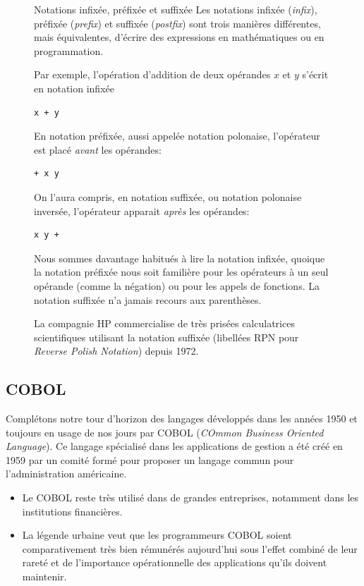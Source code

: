 \begin{figure}[t]
  \setlength{\FrameRule}{1pt}
  \begin{emphbox}{\mdseries Notations infixée, préfixée et suffixée}
    Les notations infixée (\emph{infix}), préfixée (\emph{prefix}) et
    suffixée (\emph{postfix}) sont trois manières différentes, mais
    équivalentes, d'écrire des expressions en mathématiques ou en
    programmation.

    Par exemple, l'opération d'addition de deux opérandes $x$ et $y$
    s'écrit en notation infixée
\begin{lstlisting}[backgroundcolor=\color{codebg}]
x + y
\end{lstlisting}
    En notation préfixée, aussi appelée notation polonaise,
    l'opérateur est placé \emph{avant} les opérandes:
\begin{lstlisting}[backgroundcolor=\color{codebg}]
+ x y
\end{lstlisting}
    On l'aura compris, en notation suffixée, ou notation polonaise
    inversée, l'opérateur apparait \emph{après} les opérandes:
\begin{lstlisting}[backgroundcolor=\color{codebg}]
x y +
\end{lstlisting}
    Nous sommes davantage habitués à lire la notation infixée, quoique
    la notation préfixée nous soit familière pour les opérateurs à un
    seul opérande (comme la négation) ou pour les appels de fonctions.
    La notation suffixée n'a jamais recours aux parenthèses.

    La compagnie HP commercialise de très prisées calculatrices
    scientifiques utilisant la notation suffixée (libellées RPN pour
    \emph{Reverse Polish Notation}) depuis 1972.
  \end{emphbox}
\end{figure}

\subsection{COBOL}
\label{sec:informatique:historique:cobol}

Complétons notre tour d'horizon des langages développés dans les
années 1950 et toujours en usage de nos jours par COBOL (\emph{COmmon
  Business Oriented Language}). Ce langage spécialisé dans les
applications de gestion a été créé en 1959 par un comité formé pour
proposer un langage commun pour l'administration américaine.
\begin{itemize}
\item Le COBOL reste très utilisé dans de grandes entreprises,
  notamment dans les institutions financières.
\item La légende urbaine veut que les programmeurs COBOL soient
  comparativement très bien rémunérés aujourd'hui sous l'effet combiné
  de leur rareté et de l'importance opérationnelle des applications
  qu'ils doivent maintenir.
\end{itemize}

